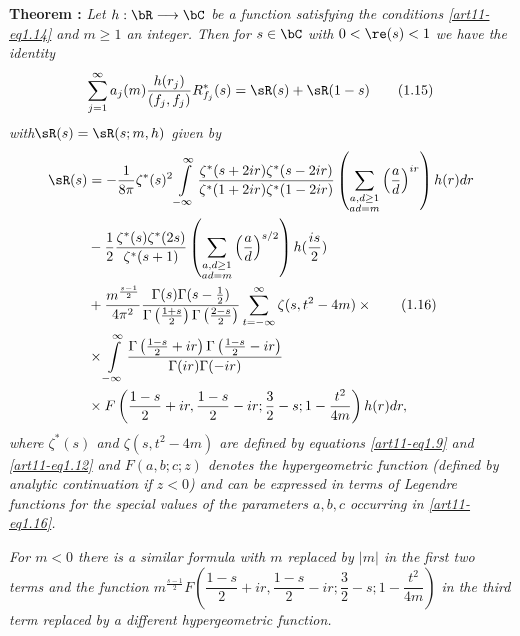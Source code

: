 \medskip
\noindent
{\bfseries Theorem :\label{art11-thm1}}
\textit{Let $h : \bR \longrightarrow \bC$ be a function satisfying the conditions \eqref{art11-eq1.14} and $m \geqslant 1$ an integer. Then for $s \in\bC$ with $0 <\re (s) <1$ we have the identity}
\begin{equation*}
\sum\limits^\infty_{j =1} a_j(m) \frac{h(r_j)}{(f_j, f_j)} R^\ast_{f_j} (s) = \sR(s) + \sR(1-s)
\tag{1.15}\label{art11-eq1.15}
\end{equation*}
\textit{with\pageoriginale $\sR(s) = \sR (s; m,h)$ given by }
\begin{align*}
\sR (s) & = - \frac{1}{8 \pi} \zeta^\ast (s)^2 \int\limits^\infty_{-\infty} \frac{\zeta^\ast (s+ 2 ir) \zeta^\ast (s-2ir)}{\zeta^\ast (1+ 2 ir ) \zeta^\ast (1-2 ir)} \left(\sum\limits_{\substack{a, d \geq 1\\ ad =m}} \left(\frac{a}{d} \right)^{ir}  \right) h (r) dr \\
&- \frac{1}{2} \frac{\zeta^\ast (s) \zeta^\ast (2s)}{\zeta^\ast (s+1)} \left(\sum\limits_{\substack{a, d \geq 1\\ ad =m}} \left(\frac{a}{d} \right)^{s/2}  \right) h (\frac{is}{2}) \\
&+ \frac{m^{\frac{s-1}{2}}}{4\pi^2} \frac{\Gamma (s) \Gamma (s - \frac{1}{2})}{\Gamma \left(\frac{1+s}{2} \right) \Gamma \left(\frac{2-s}{2} \right)} \sum\limits^\infty_{t = - \infty} \zeta(s, t^2 - 4 m) \times \tag{1.16}\label{art11-eq1.16}\\
& \times \int\limits^\infty_{-\infty} \frac{\Gamma \left(\frac{1-s}{2} + ir \right) \Gamma\left(\frac{1-s}{2} - ir \right) }{\Gamma (ir) \Gamma (-ir)}\\
& \times F \left(\frac{1-s}{2} + ir, \frac{1-s}{2} - ir; \frac{3}{2} - s ; 1 - \frac{t^2}{4 m} \right) h (r) dr, 
\end{align*}
\textit{where $\zeta^\ast(s)$ and $\zeta (s, t^2 - 4 m)$ are defined by equations \eqref{art11-eq1.9} and \eqref{art11-eq1.12} and $F(a, b; c; z)$ denotes the hypergeometric function (defined by analytic continuation if $z<0$) and can be expressed in terms of Legendre functions for the special values of the parameters $a, b, c$ occurring in \eqref{art11-eq1.16}.}

\textit{For $m<0$ there is a similar formula with $m$ replaced by $|m|$ in the first two terms and the function $m^{\frac{s-1}{2}} F \left(\dfrac{1-s}{2} + ir, \dfrac{1-s}{2} -ir ; \dfrac{3}{2} - s; 1 - \dfrac{t^2}{4m} \right)$ in the third term replaced by a different hypergeometric function.}

